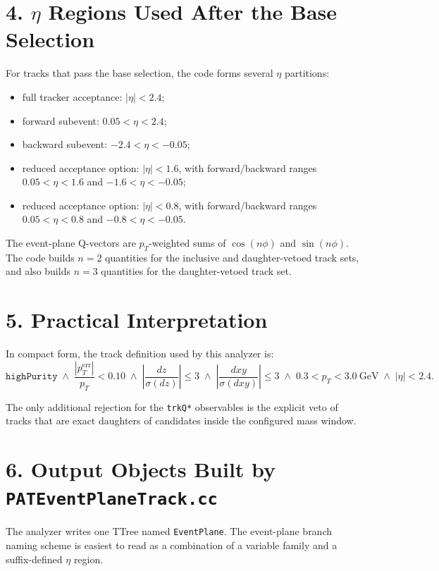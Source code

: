 \documentclass[11pt]{article}
\begin{document}
\section*{4. $\eta$ Regions Used After the Base Selection}

For tracks that pass the base selection, the code forms several $\eta$ partitions:
\begin{itemize}
\item full tracker acceptance: $|\eta| < 2.4$;
\item forward subevent: $0.05 < \eta < 2.4$;
\item backward subevent: $-2.4 < \eta < -0.05$;
\item reduced acceptance option: $|\eta| < 1.6$, with forward/backward ranges
  $0.05 < \eta < 1.6$ and $-1.6 < \eta < -0.05$;
\item reduced acceptance option: $|\eta| < 0.8$, with forward/backward ranges
  $0.05 < \eta < 0.8$ and $-0.8 < \eta < -0.05$.
\end{itemize}

The event-plane Q-vectors are $p_{T}$-weighted sums of $\cos(n\phi)$ and $\sin(n\phi)$.
The code builds $n=2$ quantities for the inclusive and daughter-vetoed track sets, and
also builds $n=3$ quantities for the daughter-vetoed track set.

\section*{5. Practical Interpretation}

In compact form, the track definition used by this analyzer is:
\[
\texttt{highPurity}
\;\land\;
\frac{|p_{T}^{\mathrm{err}}|}{p_{T}} < 0.10
\;\land\;
\left|\frac{dz}{\sigma(dz)}\right| \le 3
\;\land\;
\left|\frac{dxy}{\sigma(dxy)}\right| \le 3
\;\land\;
0.3 < p_{T} < 3.0~\mathrm{GeV}
\;\land\;
|\eta| < 2.4.
\]

The only additional rejection for the \texttt{trkQ*} observables is the explicit veto of
tracks that are exact daughters of candidates inside the configured mass window.

\section*{6. Output Objects Built by \texttt{PATEventPlaneTrack.cc}}

The analyzer writes one TTree named \texttt{EventPlane}. The event-plane branch naming
scheme is easiest to read as a combination of a variable family and a suffix-defined
$\eta$ region.
\end{document}
